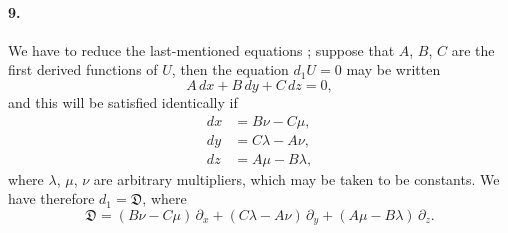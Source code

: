 \documentclass[12pt,a4paper]{article}
\theoremstyle{plain}
\begin{document}
\paragraph{9.}
We   have  to   reduce   the   last-mentioned    equations ;    suppose   that   $A$,   $B$,  $C$  are
the  first  derived  functions  of  $U$,  then  the  equation  $d_1 U = 0$  may  be  written
\[
A\, dx + B\, dy + C\, dz = 0,
\]
and  this  will  be  satisfied  identically  if
\begin{align*}
dx &= B\nu - C\mu, \\
dy &= C\lambda - A\nu, \\
dz &= A\mu - B\lambda,
\end{align*}
where  $\lambda$,  $\mu$,  $\nu$  are  arbitrary  multipliers,  which  may  be   taken   to   be   constants.     We  have
therefore  $d_1 = \mathfrak{D}$,  where
\[
\mathfrak{D} = (B\nu - C\mu) \, \partial_x + (C\lambda - A\nu) \, \partial_y + (A\mu - B\lambda) \, \partial_z.
\]
\end{document}
